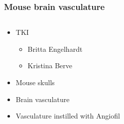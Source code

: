 \documentclass[aspectratio=169]{beamer}
\newcommand{\uaf}{\si{\micro}Angiofil\xspace}%
\begin{document}
\begin{frame}
	\frametitle{Mouse brain vasculature}
	\begin{columns}
		\begin{column}{0.495\linewidth}
			\begin{itemize}
				\item TKI
				\begin{itemize}%
					\item Britta Engelhardt
					\item Kristina Berve
				\end{itemize}
				\item Mouse skulls
				\item Brain vasculature
				\item Vasculature instilled with \uaf~\cite{Hlushchuk2018} 
			\end{itemize}
		\end{column}
		\begin{column}{0.495\linewidth}
%
		\end{column}
	\end{columns}
\end{frame}
\end{document}
